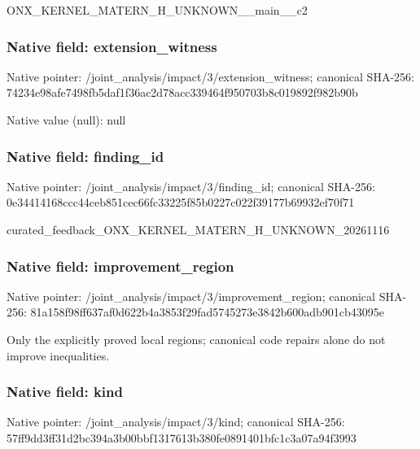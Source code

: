 \documentclass[10pt,a4paper]{article}
\begin{document}
\begingroup\raggedright\sloppy ONX\_\allowbreak{}KERNEL\_\allowbreak{}MATERN\_\allowbreak{}H\_\allowbreak{}UNKNOWN\_\allowbreak{}\_\allowbreak{}main\_\allowbreak{}\_\allowbreak{}c2\par\endgroup

\subsubsection{Native field: extension\_\allowbreak{}witness}
Native pointer: /joint\_\allowbreak{}analysis/impact/3/extension\_\allowbreak{}witness; canonical SHA-256: 74234e98afe7498fb5daf1f36ac2d78acc339464f950703b8c019892f982b90b

Native value (null): null

\subsubsection{Native field: finding\_\allowbreak{}id}
Native pointer: /joint\_\allowbreak{}analysis/impact/3/finding\_\allowbreak{}id; canonical SHA-256: 0e34414168ccc44ceb851cec66fc33225f85b0227c022f39177b69932ef70f71

\begingroup\raggedright\sloppy curated\_\allowbreak{}feedback\_\allowbreak{}ONX\_\allowbreak{}KERNEL\_\allowbreak{}MATERN\_\allowbreak{}H\_\allowbreak{}UNKNOWN\_\allowbreak{}20261116\par\endgroup

\subsubsection{Native field: improvement\_\allowbreak{}region}
Native pointer: /joint\_\allowbreak{}analysis/impact/3/improvement\_\allowbreak{}region; canonical SHA-256: 81a158f98ff637af0d622b4a3853f29fad5745273e3842b600adb901cb43095e

\begingroup\raggedright\sloppy Only the explicitly proved local regions;\allowbreak{} canonical code repairs alone do not improve inequalities.\par\endgroup

\subsubsection{Native field: kind}
Native pointer: /joint\_\allowbreak{}analysis/impact/3/kind; canonical SHA-256: 57ff9dd3ff31d2bc394a3b00bbf1317613b380fe0891401bfc1c3a07a94f3993
\end{document}
